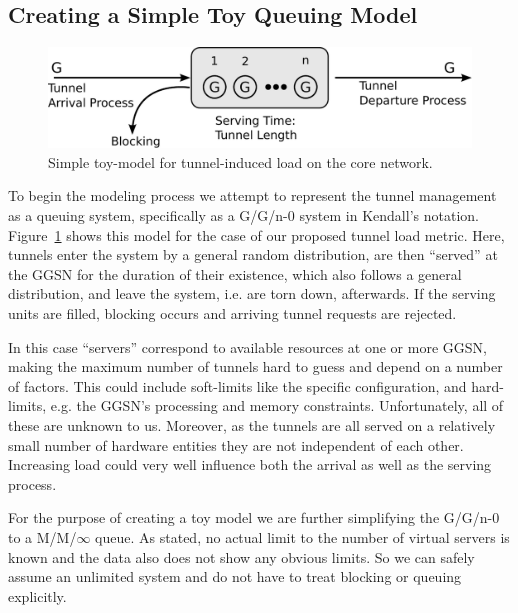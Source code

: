 \subsection{Creating a Simple Toy Queuing Model}

\begin{figure}
	\centering
	\includegraphics[width=\columnwidth]{images/IMC2013/GGn-model.pdf}
	\caption{Simple toy-model for tunnel-induced load on the core network.}
	\label{fig:ggn-model}
\end{figure}

To begin the modeling process we attempt to represent the tunnel management as a queuing system, specifically as a G/G/n-0 system in Kendall's notation. Figure~\ref{fig:ggn-model} shows this model for the case of our proposed tunnel load metric. Here, tunnels enter the system by a general random distribution, are then ``served'' at the \ac{GGSN} for the duration of their existence, which also follows a general distribution, and leave the system, i.e. are torn down, afterwards. If the serving units are filled, blocking occurs and arriving tunnel requests are rejected.

In this case ``servers'' correspond to available resources at one or more \ac{GGSN}, making the maximum number of tunnels hard to guess and depend on a number of factors. This could include soft-limits like the specific configuration, and hard-limits, e.g. the \ac{GGSN}'s processing and memory constraints. Unfortunately, all of these are unknown to us. Moreover, as the tunnels are all served on a relatively small number of hardware entities they are not independent of each other. Increasing load could very well influence both the arrival as well as the serving process.

For the purpose of creating a toy model we are further simplifying the G/G/n-0 to a M/M/$\infty$ queue. As stated, no actual limit to the number of virtual servers is known and the data also does not show any obvious limits. So we can safely assume an unlimited system and do not have to treat blocking or queuing explicitly.

